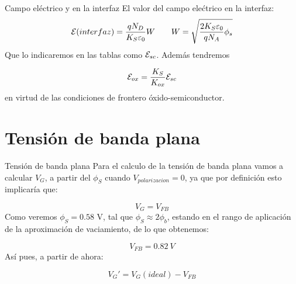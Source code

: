\documentclass{/home/daniel/GitHub/USC-Physics-Degree-Notes/Notes/Presentacion}
\begin{document}
\begin{frame}{Campo eléctrico y en la interfaz}
    El valor del campo elećtrico en la interfaz: 
    \begin{equation*}
        \mathcal{E} (interfaz) = \frac{qN_D}{K_S\varepsilon_0} W \qquad W = \sqrt{\frac{2K_S\varepsilon_0}{qN_A} \phi_s}
    \end{equation*}
    Que lo indicaremos en las tablas como $\mathcal{E}_{sc}$. Además tendremos 

    \begin{equation}
        \mathcal{E}_{ox} = \frac{K_S}{K_{ox}} \mathcal{E}_{sc}
    \end{equation}
    en virtud de las condiciones de frontero óxido-semiconductor.

\end{frame}

\section{Tensión de banda plana}

\begin{frame}{Tensión de banda plana}
    Para el calculo de la tensión de banda plana vamos a calcular $V_G$, a partir del $\phi_S$ cuando $V_{polarizacion}=0$, ya que por definición esto implicaría que:

    \begin{equation}
        V_G = V_{FB}
    \end{equation}
    Como veremos $\phi_S=0.58$ V, tal que $\phi_S \approx 2 \phi_b$, estando en el rango de aplicación de la aproximación de vaciamiento, de lo que obtenemos: 

    \begin{equation}
        V_{FB}= 0.82 \ \unit{V}
    \end{equation}
    Así pues, a partir de ahora:

    \begin{equation}
        V_G' = V_G (ideal) - V_{FB}
    \end{equation}

\end{frame}

\end{document}
